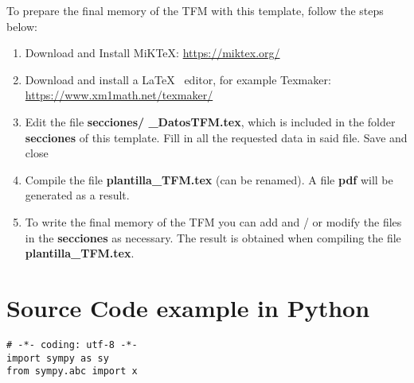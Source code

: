 \vspace*{1.5cm}
To prepare the final memory of the TFM with this template, follow the steps below:
\begin{enumerate}
\item Download and Install MiKTeX:  \url{https://miktex.org/}
\item Download and install a \LaTeX~ editor, for example Texmaker:\\
\url{https://www.xm1math.net/texmaker/}

\item Edit the file \textbf{secciones/ \_DatosTFM.tex}, which is included in the folder \textbf{secciones} of this template. Fill in all the requested data in said file. Save and close
\item Compile the file
 \textbf{plantilla\_TFM.tex} (can be renamed). A file \textbf{pdf} will be generated as a result.
\item To write the final memory of the TFM you can add and / or modify the files in the \textbf{secciones} as necessary. The result is obtained when compiling the file \textbf{plantilla\_TFM.tex}. 
\end{enumerate}



\section{Source Code example in Python}
\begin{lstlisting}[style=Python]
# -*- coding: utf-8 -*-
import sympy as sy
from sympy.abc import x
\end{lstlisting}
